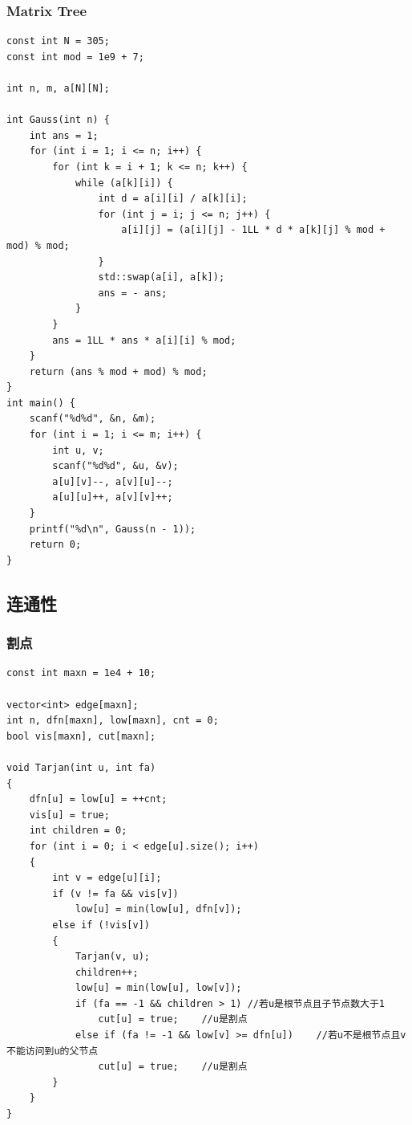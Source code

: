 \documentclass[twoside]{article}
\begin{document}
\subsubsection{Matrix Tree}
\begin{lstlisting}
const int N = 305;
const int mod = 1e9 + 7;

int n, m, a[N][N];

int Gauss(int n) {
    int ans = 1;
    for (int i = 1; i <= n; i++) {
        for (int k = i + 1; k <= n; k++) {
            while (a[k][i]) {
                int d = a[i][i] / a[k][i];
                for (int j = i; j <= n; j++) {
                    a[i][j] = (a[i][j] - 1LL * d * a[k][j] % mod + mod) % mod;
                }
                std::swap(a[i], a[k]);
                ans = - ans;
            }
        }
        ans = 1LL * ans * a[i][i] % mod;
    }
    return (ans % mod + mod) % mod;
}
int main() {
    scanf("%d%d", &n, &m);
    for (int i = 1; i <= m; i++) {
        int u, v;
        scanf("%d%d", &u, &v);
        a[u][v]--, a[v][u]--;
        a[u][u]++, a[v][v]++;
    }
    printf("%d\n", Gauss(n - 1));
    return 0;
}\end{lstlisting}
\subsection{连通性}
\subsubsection{割点}
\begin{lstlisting}
const int maxn = 1e4 + 10;

vector<int> edge[maxn];
int n, dfn[maxn], low[maxn], cnt = 0;
bool vis[maxn], cut[maxn];

void Tarjan(int u, int fa)
{
    dfn[u] = low[u] = ++cnt;
    vis[u] = true;
    int children = 0;
    for (int i = 0; i < edge[u].size(); i++)
    {
        int v = edge[u][i];
        if (v != fa && vis[v])
            low[u] = min(low[u], dfn[v]);
        else if (!vis[v])
        {
            Tarjan(v, u);
            children++;
            low[u] = min(low[u], low[v]);
            if (fa == -1 && children > 1) //若u是根节点且子节点数大于1
                cut[u] = true;    //u是割点
            else if (fa != -1 && low[v] >= dfn[u])    //若u不是根节点且v不能访问到u的父节点
                cut[u] = true;    //u是割点
        }
    }
}\end{lstlisting}
\end{document}
